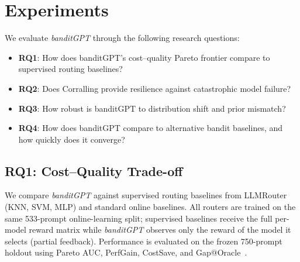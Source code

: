\section{Experiments}
\label{sec:results}

We evaluate \textit{banditGPT} through the following research questions:

\begin{itemize}[nosep,leftmargin=*]
    \item \textbf{RQ1}: How does banditGPT's cost--quality Pareto frontier compare to supervised routing baselines?
    \item \textbf{RQ2}: Does Corralling provide resilience against catastrophic model failure?
    \item \textbf{RQ3}: How robust is banditGPT to distribution shift and prior mismatch?
    \item \textbf{RQ4}: How does banditGPT compare to alternative bandit baselines, and how quickly does it converge?
\end{itemize}



\subsection{RQ1: Cost--Quality Trade-off}
\label{sec:pareto}

We compare \textit{banditGPT} against supervised routing baselines from LLMRouter~\cite{ding2024hybrid} (KNN, SVM, MLP) and standard online baselines.
All routers are trained on the same 533-prompt online-learning split; supervised baselines receive the full per-model reward matrix while \textit{banditGPT} observes only the reward of the model it selects (partial feedback).
Performance is evaluated on the frozen 750-prompt holdout using Pareto AUC, PerfGain, CostSave, and Gap@Oracle~\cite{hu2024routerbench}.








